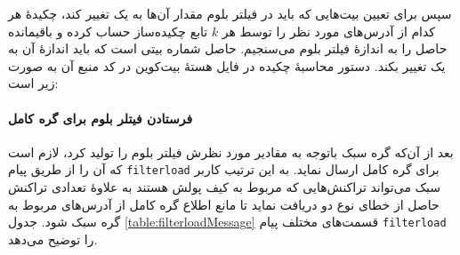 سپس برای تعیین بیت‌هایی که باید در فیلتر بلوم مقدار آن‌ها به یک تغییر کند، چکیدهٔ هر کدام از آدرس‌های مورد نظر را توسط هر $k$ تابع چکیده‌ساز حساب کرده و باقیمانده‌ حاصل را به اندازهٔ فیلتر بلوم می‌سنجیم. حاصل شماره بیتی است که باید اندازه‌ٔ آن به یک تغییر بکند. دستور محاسبهٔ چکیده در فایل  هسته‌ٔ بیت‌کوین در کد منبع آن \cite{Bitcoincore.org}به صورت زیر است:





\paragraph{فرستادن فیتلر بلوم برای گره کامل}

بعد از آن‌که گره سبک باتوجه به مقادیر مورد نظرش فیلتر بلوم را تولید کرد، لازم است که آن را از طریق پیام \texttt{filterload} برای گره کامل ارسال نماید. به این ترتیب کاربر سبک می‌تواند تراکنش‌هایی که مربوط به کیف پولش هستند به علاوهٔ تعدادی تراکنش حاصل از خطای نوع دو دریافت نماید تا مانع اطلاع گره کامل از آدرس‌های مربوط به گره سبک شود. جدول  \ref{table:filterloadMessage} قسمت‌های مختلف پیام \texttt{filterload} را توضیح می‌دهد.

